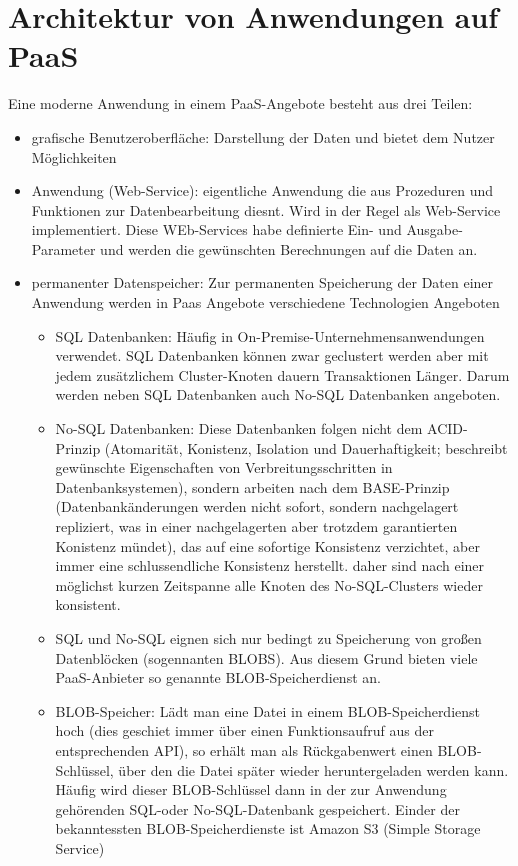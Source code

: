 \documentclass[a4paper,10pt]{article}
\begin{document}
\section{Architektur von Anwendungen auf PaaS}
Eine moderne Anwendung in einem PaaS-Angebote besteht aus drei Teilen:
\begin{itemize}
	\item grafische Benutzeroberfläche: Darstellung der Daten und bietet dem Nutzer Möglichkeiten
	\item Anwendung (Web-Service): eigentliche Anwendung die aus Prozeduren und Funktionen zur Datenbearbeitung diesnt. Wird in der Regel als Web-Service implementiert. Diese WEb-Services habe definierte Ein- und Ausgabe-Parameter und werden die gewünschten Berechnungen auf die Daten an.
	\item permanenter Datenspeicher: Zur permanenten Speicherung der Daten einer Anwendung werden in Paas Angebote verschiedene Technologien Angeboten
		\begin{itemize}
			\item SQL Datenbanken: Häufig in On-Premise-Unternehmensanwendungen  verwendet. SQL Datenbanken können zwar geclustert werden aber mit jedem zusätzlichem Cluster-Knoten dauern Transaktionen Länger. Darum werden neben SQL Datenbanken auch No-SQL Datenbanken angeboten.
			\item No-SQL Datenbanken: Diese Datenbanken folgen nicht dem ACID-Prinzip (Atomarität, Konistenz, Isolation und Dauerhaftigkeit; beschreibt gewünschte Eigenschaften von Verbreitungsschritten in Datenbanksystemen), sondern arbeiten nach dem BASE-Prinzip (Datenbankänderungen werden nicht sofort, sondern nachgelagert repliziert, was in einer nachgelagerten aber trotzdem garantierten Konistenz mündet), das auf eine sofortige Konsistenz verzichtet, aber immer eine schlussendliche Konsistenz herstellt. daher sind nach einer möglichst kurzen Zeitspanne alle Knoten des No-SQL-Clusters wieder konsistent.
			\item SQL und No-SQL eignen sich nur bedingt zu Speicherung von großen Datenblöcken (sogennanten BLOBS). Aus diesem Grund bieten viele PaaS-Anbieter so genannte BLOB-Speicherdienst an.
			\item BLOB-Speicher: Lädt man eine Datei in einem BLOB-Speicherdienst hoch (dies geschiet immer über einen Funktionsaufruf aus der entsprechenden API), so erhält man als Rückgabenwert einen BLOB-Schlüssel, über den die Datei später wieder heruntergeladen werden kann. Häufig wird dieser BLOB-Schlüssel dann in der zur Anwendung gehörenden SQL-oder No-SQL-Datenbank gespeichert. Einder der bekanntessten BLOB-Speicherdienste ist Amazon S3 (Simple Storage Service)
		\end{itemize}
\end{itemize}
\end{document}
